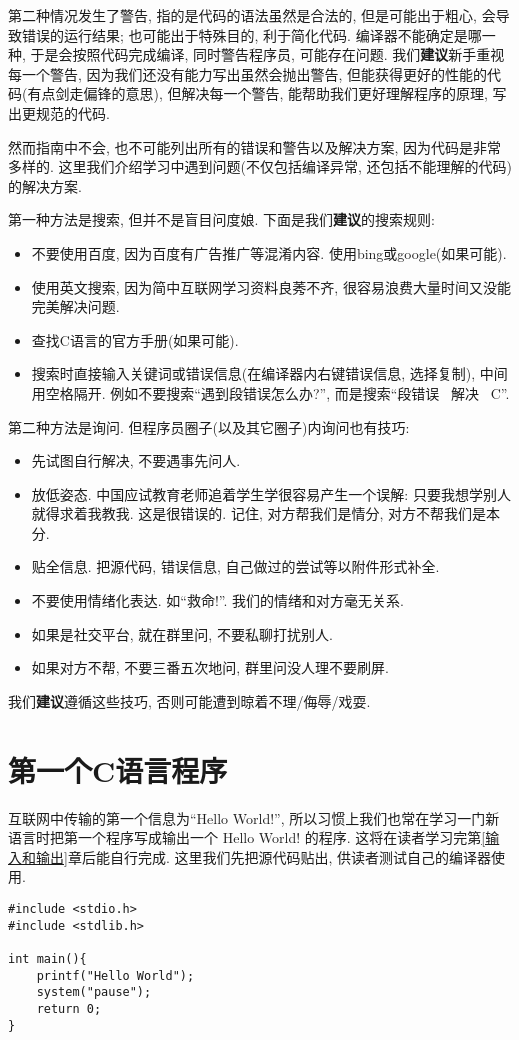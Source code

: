         第二种情况发生了警告, 指的是代码的语法虽然是合法的, 但是可能出于粗心, 会导致错误的运行结果; 也可能出于特殊目的, 利于简化代码. 编译器不能确定是哪一种, 于是会按照代码完成编译, 同时警告程序员, 可能存在问题. 我们\textbf{建议}新手重视每一个警告, 因为我们还没有能力写出虽然会抛出警告, 但能获得更好的性能的代码(有点剑走偏锋的意思), 但解决每一个警告, 能帮助我们更好理解程序的原理, 写出更规范的代码.

        然而指南中不会, 也不可能列出所有的错误和警告以及解决方案, 因为代码是非常多样的. 这里我们介绍学习中遇到问题(不仅包括编译异常, 还包括不能理解的代码)的解决方案.

        第一种方法是搜索, 但并不是盲目问度娘. 下面是我们\textbf{建议}的搜索规则:
        \begin{itemize}
            \item 不要使用百度, 因为百度有广告推广等混淆内容. 使用bing或google(如果可能).
            \item 使用英文搜索, 因为简中互联网学习资料良莠不齐, 很容易浪费大量时间又没能完美解决问题.
            \item 查找C语言的官方手册(如果可能).
            \item 搜索时直接输入关键词或错误信息(在编译器内右键错误信息, 选择复制), 中间用空格隔开. 例如不要搜索``遇到段错误怎么办?'', 而是搜索``段错误 \ 解决 \ C''.
        \end{itemize}

        第二种方法是询问. 但程序员圈子(以及其它圈子)内询问也有技巧:
        \begin{itemize}
            \item 先试图自行解决, 不要遇事先问人.
            \item 放低姿态. 中国应试教育老师追着学生学很容易产生一个误解: 只要我想学别人就得求着我教我. 这是很错误的. 记住, 对方帮我们是情分, 对方不帮我们是本分.
            \item 贴全信息. 把源代码, 错误信息, 自己做过的尝试等以附件形式补全.
            \item 不要使用情绪化表达. 如``救命!''. 我们的情绪和对方毫无关系.
            \item 如果是社交平台, 就在群里问, 不要私聊打扰别人.
            \item 如果对方不帮, 不要三番五次地问, 群里问没人理不要刷屏.
        \end{itemize}

        我们\textbf{建议}遵循这些技巧, 否则可能遭到晾着不理/侮辱/戏耍.

    \section{第一个C语言程序}
        互联网中传输的第一个信息为``Hello World!'', 所以习惯上我们也常在学习一门新语言时把第一个程序写成输出一个 Hello World! 的程序. 这将在读者学习完第\ref{输入和输出}章后能自行完成. 这里我们先把源代码贴出, 供读者测试自己的编译器使用.
\begin{lstlisting}
#include <stdio.h>
#include <stdlib.h>

int main(){
    printf("Hello World");
    system("pause");
    return 0;
}
\end{lstlisting}

